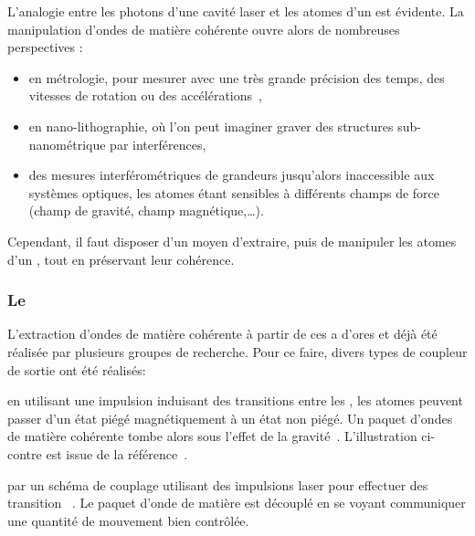 L'analogie entre les photons d'une cavité laser et les atomes d'un \becc est évidente. 
La manipulation d'ondes de matière cohérente ouvre alors de nombreuses perspectives : 
\begin{itemize}
	\item en métrologie, pour mesurer avec une très grande précision des temps, des vitesses de rotation ou des accélérations~\cite{Bor02},
	\item en nano-lithographie, où l'on peut imaginer graver des structures sub-nanométrique par interférences, 
	\item des mesures interférométriques de grandeurs jusqu'alors inaccessible aux systèmes optiques, les atomes étant sensibles à différents champs de force (champ de gravité, champ magnétique,\ldots).
\end{itemize}
Cependant, il faut disposer d'un moyen d'extraire, puis de manipuler les atomes d'un \becc, tout en préservant leur cohérence.

\subsubsection{Le \lat}
L'extraction d'ondes de matière cohérente à partir de ces \beccs a d'ores et déjà été réalisée par plusieurs groupes de recherche. Pour ce faire, divers types de coupleur de sortie ont été réalisés:
\def\spppace{\vspace{1ex}}
\def\hpppace{\hspace{-2em}}
\def\sssize{12cm}

\spppace
{} 
\hpppace
\begin{minipage}{\sssize}
\begin{ditemize}
	\item en utilisant une impulsion \rf induisant des transitions entre les \snZs, les atomes peuvent passer d'un état piégé magnétiquement à un état non piégé. Un paquet d'ondes de matière cohérente tombe alors sous l'effet de la gravité~\cite{MAK97}. L'illustration ci-contre est issue de la référence~\cite{Ket02}.
\end{ditemize}
\end{minipage}

\spppace
\hpppace
\begin{minipage}{\sssize}
\begin{ditemize}
	\item par un schéma de couplage utilisant des impulsions laser pour effectuer des transition ~\cite{HDK99}. Le paquet d'onde de matière est découplé en se voyant communiquer une quantité de mouvement bien contrôlée.
\end{ditemize}
\end{minipage}

